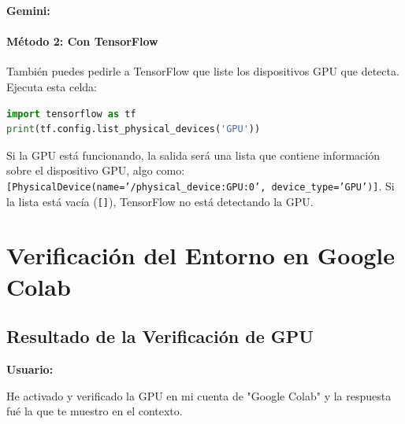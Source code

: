 \documentclass[12pt, a4paper]{article}
\newenvironment{usuario}{\par\noindent\textbf{Usuario:}\itshape\par\ignorespaces}{\par}
\newenvironment{gemini}{\par\noindent\textbf{Gemini:}\par\ignorespaces}{\par}
\begin{document}
\begin{gemini}
\paragraph{Método 2: Con TensorFlow}
También puedes pedirle a TensorFlow que liste los dispositivos GPU que detecta. Ejecuta
esta celda:
\begin{lstlisting}[language=Python]
import tensorflow as tf
print(tf.config.list_physical_devices('GPU'))
\end{lstlisting}
Si la GPU está funcionando, la salida será una lista que contiene información sobre el 
dispositivo GPU, algo como: \texttt{[PhysicalDevice(name='/physical\_device:GPU:0', 
device\_type='GPU')]}. Si la lista está vacía (\texttt{[]}), TensorFlow no está detectando 
la GPU.
\end{gemini}

\section{Verificación del Entorno en Google Colab}

\subsection{Resultado de la Verificación de GPU}

\begin{usuario}
He activado y verificado la GPU en mi cuenta de "Google Colab" y la respuesta fué la que te muestro en el contexto.
\end{usuario}
\end{document}
